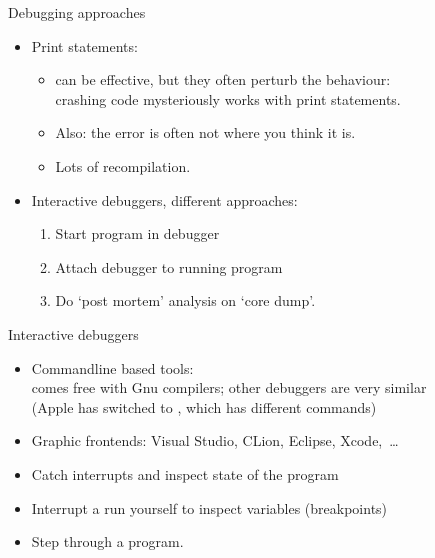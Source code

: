 \documentclass[11pt,headernav]{beamer}
\begin{document}

\begin{frame}{Debugging approaches}
  \begin{itemize}
  \item Print statements:
    \begin{itemize}
    \item can be effective, but they often perturb the behaviour:\\
      crashing code mysteriously works with print statements.
    \item Also: the error is often not where you think it is.
    \item Lots of recompilation.
    \end{itemize}
  \item Interactive debuggers, different approaches:
    \begin{enumerate}
    \item Start program in debugger
    \item Attach debugger to running program
    \item Do `post mortem' analysis on `core dump'.
    \end{enumerate}
  \end{itemize}
\end{frame}

\begin{frame}[containsverbatim]{Interactive debuggers}
  \begin{itemize}
  \item Commandline based tools:\\
     comes free with Gnu compilers; other debuggers are very
    similar\\
    (Apple has switched to , which has different commands)
  \item Graphic frontends: Visual Studio, CLion, Eclipse, Xcode,~\ldots
  \end{itemize}

  \begin{itemize}
  \item Catch interrupts and inspect state of the program
  \item Interrupt a run yourself to inspect variables (breakpoints)
  \item Step through a program.
  \end{itemize}
\end{frame}
\end{document}
